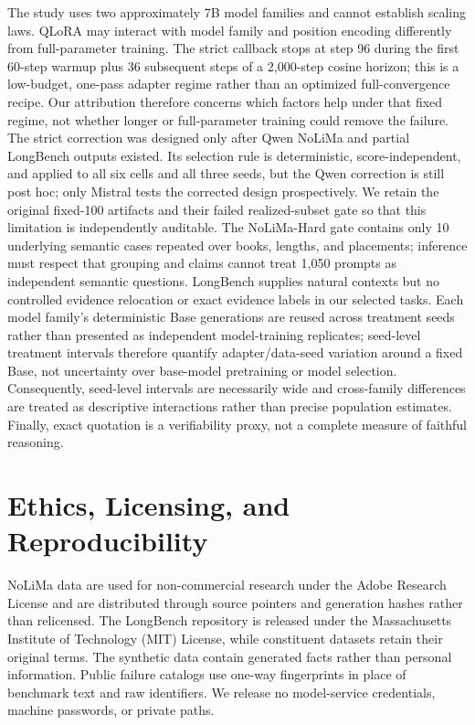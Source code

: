 \documentclass[11pt]{article}
\begin{document}
The study uses two approximately 7B model families and cannot establish scaling laws. QLoRA may interact with model family and position encoding differently from full-parameter training. The strict callback stops at step 96 during the first 60-step warmup plus 36 subsequent steps of a 2,000-step cosine horizon; this is a low-budget, one-pass adapter regime rather than an optimized full-convergence recipe. Our attribution therefore concerns which factors help under that fixed regime, not whether longer or full-parameter training could remove the failure. The strict correction was designed only after Qwen NoLiMa and partial LongBench outputs existed. Its selection rule is deterministic, score-independent, and applied to all six cells and all three seeds, but the Qwen correction is still post hoc; only Mistral tests the corrected design prospectively. We retain the original fixed-100 artifacts and their failed realized-subset gate so that this limitation is independently auditable. The NoLiMa-Hard gate contains only 10 underlying semantic cases repeated over books, lengths, and placements; inference must respect that grouping and claims cannot treat 1,050 prompts as independent semantic questions. LongBench supplies natural contexts but no controlled evidence relocation or exact evidence labels in our selected tasks. Each model family's deterministic Base generations are reused across treatment seeds rather than presented as independent model-training replicates; seed-level treatment intervals therefore quantify adapter/data-seed variation around a fixed Base, not uncertainty over base-model pretraining or model selection. Consequently, seed-level intervals are necessarily wide and cross-family differences are treated as descriptive interactions rather than precise population estimates. Finally, exact quotation is a verifiability proxy, not a complete measure of faithful reasoning.

\section{Ethics, Licensing, and Reproducibility}

NoLiMa data are used for non-commercial research under the Adobe Research License and are distributed through source pointers and generation hashes rather than relicensed. The LongBench repository is released under the Massachusetts Institute of Technology (MIT) License, while constituent datasets retain their original terms. The synthetic data contain generated facts rather than personal information. Public failure catalogs use one-way fingerprints in place of benchmark text and raw identifiers. We release no model-service credentials, machine passwords, or private paths.
\end{document}
